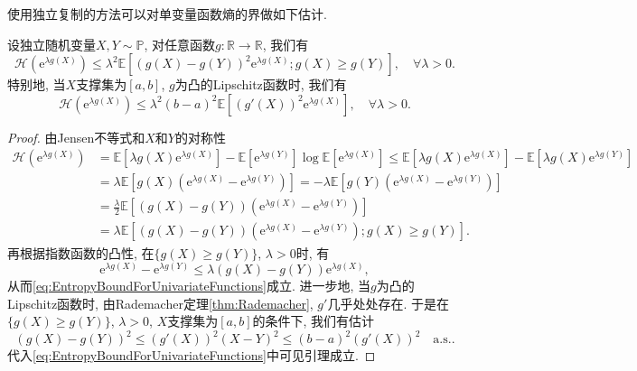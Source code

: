 使用独立复制的方法可以对单变量函数熵的界做如下估计. 
\begin{lemma}[单变量函数熵的界]\label{lemma:EntropyBoundForUnivariateFunctions}
	设独立随机变量$X, Y \sim \mathbb{P}$, 对任意函数$g \colon \mathbb{R} \to \mathbb{R}$, 我们有
	\begin{equation}\label{eq:EntropyBoundForUnivariateFunctions}
		\mathcal{H}(\mathrm{e}^{\lambda g(X)})
		\leq \lambda^2 \mathbb{E}[ (g(X) - g(Y))^2 \mathrm{e}^{\lambda g(X)}; g(X) \geq g(Y) ], \quad \forall \lambda > 0.
	\end{equation}
	特别地, 当$X$支撑集为$[a, b]$, $g$为凸的Lipschitz函数时, 我们有
	\begin{equation*}
		\mathcal{H}(\mathrm{e}^{\lambda g(X)}) 
		\leq \lambda^2 (b-a)^2 \mathbb{E}[(g'(X))^2 \mathrm{e}^{\lambda g(X)}], \quad \forall \lambda > 0.
	\end{equation*}
\end{lemma}
\begin{proof}
	由Jensen不等式和$X$和$Y$的对称性
	\begin{align*}
		\mathcal{H}(\mathrm{e}^{\lambda g(X)})
		&= \mathbb{E}[\lambda g(X) \mathrm{e}^{\lambda g(X)}] - \mathbb{E}[\mathrm{e}^{\lambda g(Y)}] \log \mathbb{E}[\mathrm{e}^{\lambda g(X)}] 
		\leq \mathbb{E}[\lambda g(X) \mathrm{e}^{\lambda g(X)}] - \mathbb{E}[\lambda g(X) \mathrm{e}^{\lambda g(Y)}] \\
		&= \lambda \mathbb{E}[ g(X) (\mathrm{e}^{\lambda g(X)}-  \mathrm{e}^{\lambda g(Y)})] 
		= - \lambda \mathbb{E}[ g(Y) (\mathrm{e}^{\lambda g(X)}-  \mathrm{e}^{\lambda g(Y)})] \\
		&= \frac{\lambda}{2} \mathbb{E}\left[(g(X) - g(Y)) (\mathrm{e}^{\lambda g(X)} - \mathrm{e}^{\lambda g(Y)})\right] \\
		&= \lambda \mathbb{E}\left[(g(X) - g(Y)) (\mathrm{e}^{\lambda g(X)} - \mathrm{e}^{\lambda g(Y)}); g(X) \geq g(Y) \right].
	\end{align*}
	再根据指数函数的凸性, 在$\{g(X) \geq g(Y)\}$, $\lambda > 0$时, 有
	\begin{equation*}
		\mathrm{e}^{\lambda g(X)} - \mathrm{e}^{\lambda g(Y)} \leq \lambda(g(X) - g(Y)) \mathrm{e}^{\lambda g(X)}, 
	\end{equation*}
	从而\eqref{eq:EntropyBoundForUnivariateFunctions}成立. 
	进一步地, 当$g$为凸的Lipschitz函数时, 由Rademacher定理\ref{thm:Rademacher}, $g'$几乎处处存在. 
	于是在$\{g(X) \geq g(Y)\}$, $\lambda > 0$, $X$支撑集为$[a, b]$的条件下, 我们有估计
	\begin{equation*}
		(g(X) - g(Y))^2 \leq (g'(X))^2 (X-Y)^2 \leq (b-a)^2 (g'(X))^2 \quad \text{a.s.}.
	\end{equation*}
	代入\eqref{eq:EntropyBoundForUnivariateFunctions}中可见引理成立. 
\end{proof}

